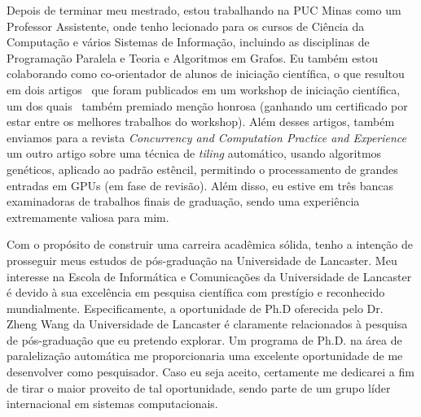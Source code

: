 \documentclass{article}
\begin{document}
Depois de terminar meu mestrado, estou trabalhando na PUC Minas como um
Professor Assistente, onde tenho lecionado para os cursos de Ci\^{e}ncia da Computa\c{c}\~{a}o e v\'{a}rios
Sistemas de Informa\c{c}\~{a}o, incluindo as disciplinas de Programa\c{c}\~{a}o Paralela e Teoria e
Algoritmos em Grafos. Eu tamb\'{e}m estou colaborando como co-orientador de
alunos de inicia\c{c}\~{a}o cient\'{i}fica, o que resultou em dois
artigos~\cite{saffran2015apriori,pereira2015stencilbench} que foram publicados em
um workshop de inicia\c{c}\~{a}o cient\'{i}fica, um dos quais~\cite{pereira2015stencilbench}
tamb\'{e}m premiado men\c{c}\~{a}o honrosa (ganhando um certificado por estar entre os melhores
trabalhos do workshop). Al\'{e}m desses artigos, tamb\'{e}m enviamos para a
revista {\em Concurrency and Computation Practice and Experience} um outro artigo sobre
uma t\'{e}cnica de {\em tiling} autom\'{a}tico, usando algoritmos gen\'{e}ticos, aplicado ao padr\~{a}o est\^{e}ncil,
permitindo o processamento de grandes entradas em GPUs (em fase de revis\~{a}o).
Al\'{e}m disso, eu estive em tr\^{e}s bancas examinadoras de trabalhos finais de gradua\c{c}\~{a}o,
sendo uma experi\^{e}ncia extremamente valiosa para mim.

Com o prop\'{o}sito de construir uma carreira acad\^{e}mica s\'{o}lida, tenho a inten\c{c}\~{a}o de prosseguir meus
estudos de p\'{o}s-gradua\c{c}\~{a}o na Universidade de Lancaster. Meu interesse na Escola de
Inform\'{a}tica e Comunica\c{c}\~{o}es da Universidade de Lancaster \'{e} devido \`{a} sua
excel\^{e}ncia em pesquisa cient\'{i}fica com prest\'{i}gio e reconhecido mundialmente. Especificamente, a oportunidade de Ph.D oferecida pelo Dr. Zheng Wang da Universidade de Lancaster \'{e} claramente
relacionados \`{a} pesquisa de p\'{o}s-gradua\c{c}\~{a}o que eu pretendo explorar. Um programa de Ph.D.
na \'{a}rea de paraleliza\c{c}\~{a}o autom\'{a}tica me proporcionaria uma excelente
oportunidade de me desenvolver como pesquisador.
Caso eu seja aceito, certamente me dedicarei a fim de tirar o maior proveito de tal oportunidade, sendo parte
de um grupo l\'{i}der internacional em sistemas computacionais.

\nocite{*}


\end{document}
